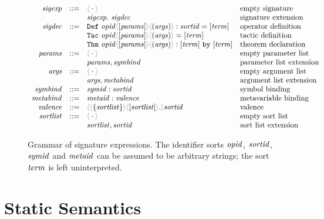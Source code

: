 \documentclass{article}
\begin{document}
\begin{figure}[H]
  \begin{displaymath}
    \begin{array}{rcll}
       \SortSigExpr & ::=
         & \EmptySig & \text{empty signature}\\
         && \ExtendSig{\SortSigExpr}{\SortSigDecl} & \text{signature extension}\\
       \SortSigDecl & ::=
         & \DefDecl{\SortOpId}{\SortParams}{\SortArgs}{\SortSortId}{\SortTerm} & \text{operator definition}\\
         && \TacDecl{\SortOpId}{\SortParams}{\SortArgs}{\SortTerm} & \text{tactic definition}\\
         && \ThmDecl{\SortOpId}{\SortParams}{\SortArgs}{\SortTerm}{\SortTerm} & \text{theorem declaration}\\
       \SortParams & ::=
         & \EmptyCtx & \text{empty parameter list}\\
         && \ExtendCtx{\SortParams}{\SortSymBind} & \text{parameter list extension}\\
       \SortArgs & ::=
         & \EmptyCtx & \text{empty argument list}\\
         && \ExtendCtx{\SortArgs}{\SortMetaBind}  & \text{argument list extension}\\
       \SortSymBind & ::=
         & \Bind{\SortSymId}{\SortSortId} & \text{symbol binding}\\
       \SortMetaBind & ::=
         & \Bind{\SortMetaId}{\SortValence} & \text{metavariable binding}\\
       \SortValence & ::=
         & \Valence{\SortSortList}{\SortSortList}{\SortSortId} & \text{valence}\\
       \SortSortList & ::=
         & \EmptyCtx & \text{empty sort list}\\
         && \ExtendCtx{\SortSortList}{\SortSortId} & \text{sort list extension}
     \end{array}
  \end{displaymath}

  \caption{%
    Grammar of signature expressions. The identifier sorts $\mathit{opid}$,
    $\mathit{sortid}$, $\mathit{symid}$ and $\mathit{metaid}$ can be assumed to be arbitrary
    strings; the sort $\mathit{term}$ is left uninterpreted.%
  }
  \label{fig:grammar}
\end{figure}

\section{Static Semantics}
\label{sec:statics}
\end{document}

